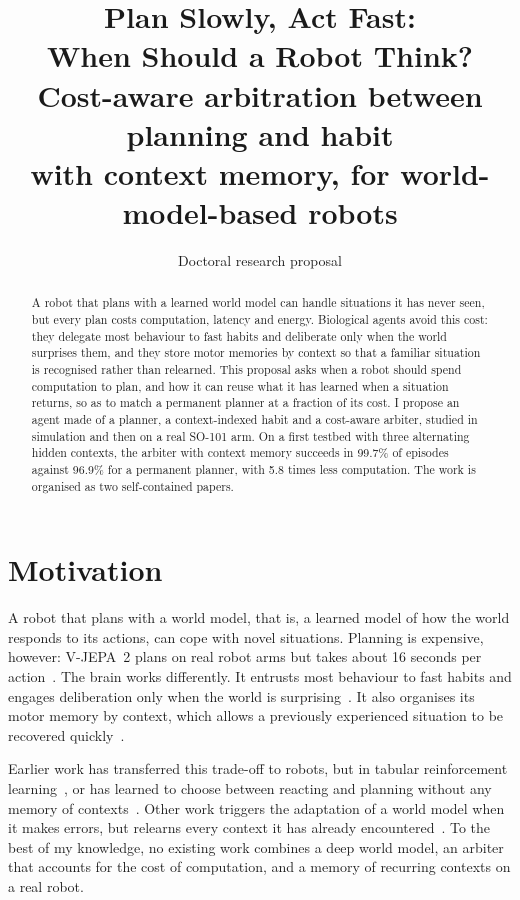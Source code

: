 \documentclass[11pt,a4paper]{article}
\title{\textbf{Plan Slowly, Act Fast:\\When Should a Robot Think?}\\[4pt]
\large Cost-aware arbitration between planning and habit\\with context memory, for world-model-based robots}
\author{Doctoral research proposal}
\date{}
\begin{document}
\maketitle

\begin{abstract}
\noindent A robot that plans with a learned world model can handle situations it has never seen, but every plan costs computation, latency and energy. Biological agents avoid this cost: they delegate most behaviour to fast habits and deliberate only when the world surprises them, and they store motor memories by context so that a familiar situation is recognised rather than relearned. This proposal asks when a robot should spend computation to plan, and how it can reuse what it has learned when a situation returns, so as to match a permanent planner at a fraction of its cost. I propose an agent made of a planner, a context-indexed habit and a cost-aware arbiter, studied in simulation and then on a real SO-101 arm. On a first testbed with three alternating hidden contexts, the arbiter with context memory succeeds in 99.7\% of episodes against 96.9\% for a permanent planner, with 5.8 times less computation. The work is organised as two self-contained papers.
\end{abstract}

\section{Motivation}
A robot that plans with a world model, that is, a learned model of how the world responds to its actions, can cope with novel situations. Planning is expensive, however: V-JEPA~2 plans on real robot arms but takes about 16 seconds per action~\cite{assran2025vjepa2}. The brain works differently. It entrusts most behaviour to fast habits and engages deliberation only when the world is surprising~\cite{daw2005uncertainty,keramati2011speed}. It also organises its motor memory by context, which allows a previously experienced situation to be recovered quickly~\cite{heald2021contextual}.

Earlier work has transferred this trade-off to robots, but in tabular reinforcement learning~\cite{dromnelle2023reducing}, or has learned to choose between reacting and planning without any memory of contexts~\cite{labiosa2026when}. Other work triggers the adaptation of a world model when it makes errors, but relearns every context it has already encountered~\cite{domberg2026selfadapting}. To the best of my knowledge, no existing work combines a deep world model, an arbiter that accounts for the cost of computation, and a memory of recurring contexts on a real robot.
\end{document}
